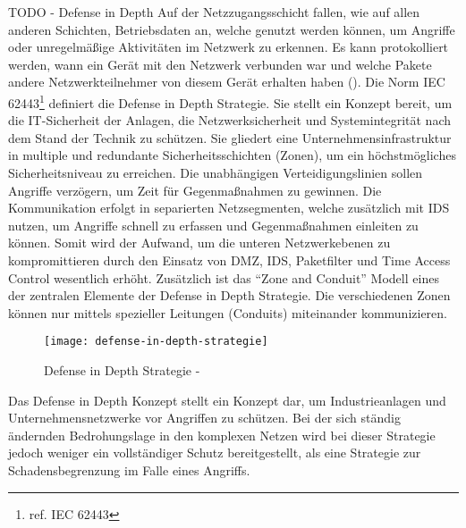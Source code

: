 TODO - Defense in Depth
Auf der Netzzugangsschicht fallen, wie auf allen anderen Schichten, Betriebsdaten an, welche genutzt werden können, um Angriffe oder unregelmäßige Aktivitäten im Netzwerk zu erkennen. Es kann protokolliert werden, wann ein Gerät mit den Netzwerk verbunden war und welche Pakete andere Netzwerkteilnehmer von diesem Gerät erhalten haben (\cite{sichKom2017}). Die Norm IEC 62443\footnote{ref. IEC 62443} definiert die Defense in Depth Strategie. Sie stellt ein Konzept bereit, um die IT-Sicherheit der Anlagen, die Netzwerksicherheit und Systemintegrität nach dem Stand der Technik zu schützen. Sie gliedert eine Unternehmensinfrastruktur in multiple und redundante Sicherheitsschichten (Zonen), um ein höchstmögliches Sicherheitsniveau zu erreichen. Die unabhängigen Verteidigungslinien sollen Angriffe verzögern, um Zeit für Gegenmaßnahmen zu gewinnen. Die Kommunikation erfolgt in separierten Netzsegmenten, welche zusätzlich mit \ac{IDS} nutzen, um Angriffe schnell zu erfassen und Gegenmaßnahmen einleiten zu können. Somit wird der Aufwand, um die unteren Netzwerkebenen zu kompromittieren durch den Einsatz von \ac{DMZ}, \ac{IDS}, Paketfilter und Time Access Control wesentlich erhöht. Zusätzlich ist das "`Zone and Conduit"' Modell eines der zentralen Elemente der Defense in Depth Strategie. Die verschiedenen Zonen können nur mittels spezieller Leitungen (Conduits) miteinander kommunizieren.  

\begin{figure}[h]
    \centering
    \texttt{[image: defense-in-depth-strategie]}
    \caption{Defense in Depth Strategie - \cite{kuipers2006}}
    \label{Kap3:Defense-in-Depth}
\end{figure}

\clearpage

Das Defense in Depth Konzept stellt ein Konzept dar, um Industrieanlagen und Unternehmensnetzwerke vor Angriffen zu schützen. Bei der sich ständig ändernden Bedrohungslage in den komplexen Netzen wird bei dieser Strategie jedoch weniger ein vollständiger Schutz bereitgestellt, als eine Strategie zur Schadensbegrenzung im Falle eines Angriffs.